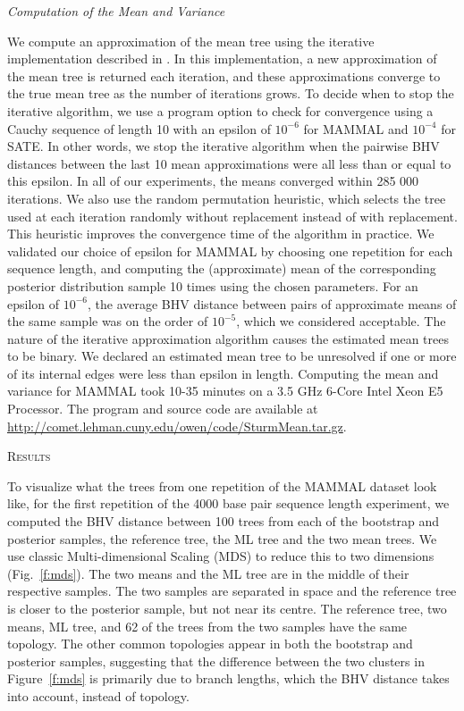 \documentclass[12pt,letterpaper]{article}
\theoremstyle{plain}
\theoremstyle{definition}
\renewcommand{\section}[1]{%
\bigskip
\begin{center}
\begin{Large}
\normalfont\scshape #1
\medskip
\end{Large}
\end{center}}
\renewcommand{\subsection}[1]{%
\bigskip
\begin{center}
\begin{large}
\normalfont\itshape #1
\end{large}
\end{center}}
\begin{document}
\subsection{Computation of the Mean and Variance}
We compute an approximation of the mean tree using the iterative implementation described in \citet{MillerOwenProvan2015}.  In this implementation, a new approximation of the mean tree is returned each iteration, and these approximations converge to the true mean tree as the number of iterations grows.  To decide when to stop the iterative algorithm, we use a program option to check for convergence using a Cauchy sequence of length 10 with an epsilon of $10^{-6}$ for MAMMAL and $10^{-4}$ for SATE.  In other words, we stop the iterative algorithm when the pairwise BHV distances between the last 10 mean approximations were all less than or equal to this epsilon.  In all of our experiments, the means converged within 285 000 iterations. We also use the random permutation heuristic, which selects the tree used at each iteration randomly without replacement instead of with replacement.  This heuristic improves the convergence time of the algorithm in practice.  We validated our choice of epsilon for MAMMAL by choosing one repetition for each sequence length, and computing the (approximate) mean of the corresponding posterior distribution sample 10 times using the chosen parameters.  For an epsilon of $10^{-6}$, the average BHV distance between pairs of approximate means of the same sample was on the order of $10^{-5}$, which we considered acceptable. The nature of the iterative approximation algorithm causes the estimated mean trees to be binary.  We declared an estimated mean tree to be unresolved if one or more of its internal edges were less than epsilon in length. Computing the mean and variance for MAMMAL took 10-35 minutes on a 3.5 GHz 6-Core Intel Xeon E5 Processor.  The program and source code are available at \url{ http://comet.lehman.cuny.edu/owen/code/SturmMean.tar.gz}.


\bigskip
\section{Results}  
To visualize what the trees from one repetition of the MAMMAL dataset look like, for the first repetition of the 4000 base pair sequence length experiment, we computed the BHV distance between 100 trees from each of the bootstrap and posterior samples, the reference tree, the ML tree and the two mean trees.  We use classic Multi-dimensional Scaling (MDS) \citep{kruskal1964mds} to reduce this to two dimensions (Fig.~\ref{f:mds}).  The two means and the ML tree are in the middle of their respective samples.  The two samples are separated in space and the reference tree is closer to the posterior sample, but not near its centre. The reference tree, two means, ML tree, and 62 of the trees from the two samples have the same topology.  The other common topologies appear in both the bootstrap and posterior samples, suggesting that the difference between the two clusters in Figure~\ref{f:mds} is primarily due to branch lengths, which the BHV distance takes into account, instead of topology.
\end{document}
